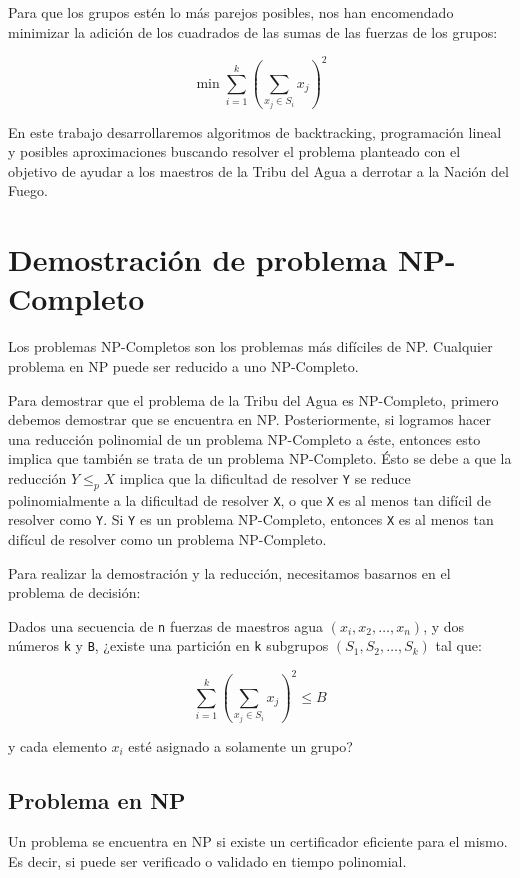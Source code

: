 \documentclass{article}
\begin{document}
Para que los grupos estén lo más parejos posibles, nos han encomendado minimizar la adición de los cuadrados de las sumas de las fuerzas de los grupos:

$$
\min \sum_{i=1}^{k} \left( \sum_{x_j \in S_i} x_j \right)^2
$$

En este trabajo desarrollaremos algoritmos de backtracking, programación lineal y posibles aproximaciones buscando resolver el problema planteado con el objetivo de ayudar a los maestros de la Tribu del Agua a derrotar a la Nación del Fuego.

\section{Demostración de problema NP-Completo}
\label{sec:np-completo}

Los problemas NP-Completos son los problemas más difíciles de NP. Cualquier problema en NP puede ser reducido a uno NP-Completo.

Para demostrar que el problema de la Tribu del Agua es NP-Completo, primero debemos demostrar que se encuentra en NP. Posteriormente, si logramos hacer una reducción polinomial de un problema NP-Completo a éste, entonces esto implica que también se trata de un problema NP-Completo. Ésto se debe a que la reducción $Y \leq_p X$ implica que la dificultad de resolver \texttt{Y} se reduce polinomialmente a la dificultad de resolver \texttt{X}, o que \texttt{X} es al menos tan difícil de resolver como \texttt{Y}. Si \texttt{Y} es un problema NP-Completo, entonces \texttt{X} es al menos tan difícul de resolver como un problema NP-Completo.

Para realizar la demostración y la reducción, necesitamos basarnos en el problema de decisión:

Dados una secuencia de \texttt{n} fuerzas de maestros agua $(x_i, x_2, \dots, x_n)$, y dos números \texttt{k} y \texttt{B}, ¿existe una partición en \texttt{k} subgrupos $(S_1, S_2, \dots, S_k)$ tal que:

$$
\sum_{i=1}^{k} \left( \sum_{x_j \in S_i} x_j \right)^2 \leq B
$$

y cada elemento $x_i$ esté asignado a solamente un grupo?
\subsection{Problema en NP}

Un problema se encuentra en NP si existe un certificador eficiente para el mismo. Es decir, si puede ser verificado o validado en tiempo polinomial. 
\end{document}
